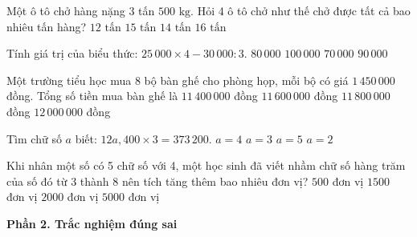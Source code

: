 \begin{ex} %
Một ô tô chở hàng nặng $3$ tấn $500\text{ kg}$. Hỏi 4 ô tô chở như thế chở được tất cả bao nhiêu tấn hàng?
\choice
{$12\text{ tấn}$}
{$15\text{ tấn}$}
{\True $14\text{ tấn}$}
{$16\text{ tấn}$}
\end{ex}

\begin{ex} %
Tính giá trị của biểu thức: $25\,000 \times 4 - 30\,000 : 3$.
\choice
{$80\,000$}
{$100\,000$}
{$70\,000$}
{\True $90\,000$}
\end{ex}

\begin{ex} %
Một trường tiểu học mua 8 bộ bàn ghế cho phòng họp, mỗi bộ có giá $1\,450\,000$ đồng. Tổng số tiền mua bàn ghế là
\choice
{$11\,400\,000$ đồng}
{\True $11\,600\,000$ đồng}
{$11\,800\,000$ đồng}
{$12\,000\,000$ đồng}
\end{ex}

\begin{ex} %
Tìm chữ số $a$ biết: $12a,400 \times 3 = 373\,200$.
\choice
{\True $a = 4$}
{$a = 3$}
{$a = 5$}
{$a = 2$}
\end{ex}

\begin{ex} %
Khi nhân một số có 5 chữ số với 4, một học sinh đã viết nhầm chữ số hàng trăm của số đó từ 3 thành 8 nên tích tăng thêm bao nhiêu đơn vị?
\choice
{$500$ đơn vị}
{$1500$ đơn vị}
{\True $2000$ đơn vị}
{$5000$ đơn vị}
\end{ex}

\textbf{Phần 2. Trắc nghiệm đúng sai}


